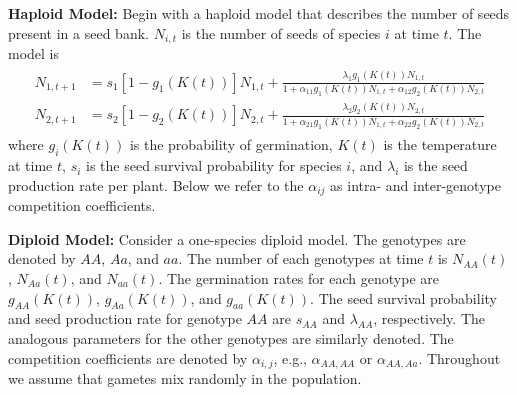 \documentclass[11pt]{article}
\begin{document}
\noindent \textbf{Haploid Model:} Begin with a haploid model that describes the number of seeds present in a seed bank.  $N_{i,t}$ is the number of seeds of species $i$ at time $t$.  The model is
\begin{align}\begin{split}
N_{1,t+1} &= s_1 [1-g_1(K(t))]N_{1,t}+\frac{\lambda_1g_1(K(t))N_{1,t}}{1+ \alpha_{11}g_1(K(t))N_{1,t} + \alpha_{12}g_2(K(t))N_{2,t}}\\
N_{2,t+1} &= s_2 [1-g_2(K(t))]N_{2,t}+\frac{\lambda_2g_2(K(t))N_{2,t}}{1+ \alpha_{21}g_1(K(t))N_{1,t} + \alpha_{22}g_2(K(t))N_{2,t}}
\end{split}\end{align}
where $g_{i}(K(t))$ is the probability of germination, $K(t)$ is the temperature at time $t$, $s_i$ is the seed survival probability for species $i$, and $\lambda_i$ is the seed production rate per plant.  Below we refer to the $\alpha_{ij}$ as intra- and inter-genotype competition coefficients.  

\noindent \textbf{Diploid Model:} Consider a one-species diploid model.  The genotypes are denoted by $AA$, $Aa$, and $aa$.   The number of each genotypes at time $t$ is $N_{AA}(t)$, $N_{Aa}(t)$, and $N_{aa}(t)$.  The germination rates for each genotype are $g_{AA}(K(t))$, $g_{Aa}(K(t))$, and $g_{aa}(K(t))$.  The seed survival probability and seed production rate for genotype $AA$ are $s_{AA}$ and $\lambda_{AA}$, respectively.  The analogous parameters for the other genotypes are similarly denoted.  The competition coefficients are denoted by $\alpha_{i,j}$, e.g., $\alpha_{AA,AA}$ or $\alpha_{AA,Aa}$.  Throughout we assume that gametes mix randomly in the population.  
\end{document}
